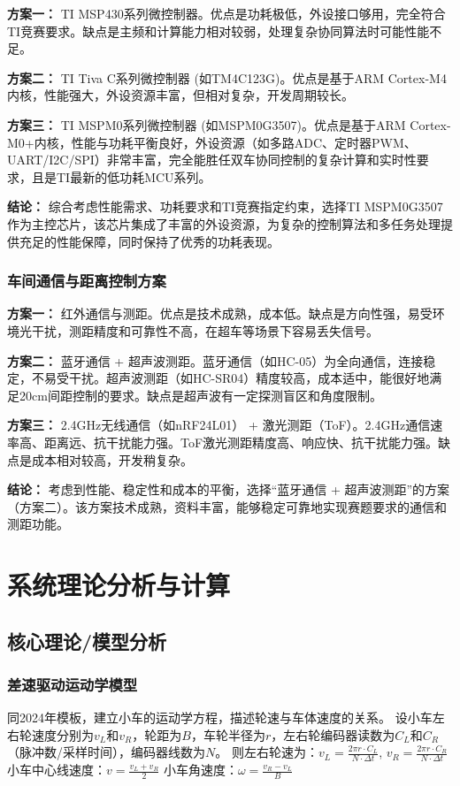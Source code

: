 \documentclass[UTF8]{ctexart}
\begin{document}
\textbf{方案一：} TI MSP430系列微控制器。优点是功耗极低，外设接口够用，完全符合TI竞赛要求。缺点是主频和计算能力相对较弱，处理复杂协同算法时可能性能不足。

\textbf{方案二：} TI Tiva C系列微控制器 (如TM4C123G)。优点是基于ARM Cortex-M4内核，性能强大，外设资源丰富，但相对复杂，开发周期较长。

\textbf{方案三：} TI MSPM0系列微控制器 (如MSPM0G3507)。优点是基于ARM Cortex-M0+内核，性能与功耗平衡良好，外设资源（如多路ADC、定时器PWM、UART/I2C/SPI）非常丰富，完全能胜任双车协同控制的复杂计算和实时性要求，且是TI最新的低功耗MCU系列。

\textbf{结论：} 综合考虑性能需求、功耗要求和TI竞赛指定约束，选择TI MSPM0G3507作为主控芯片，该芯片集成了丰富的外设资源，为复杂的控制算法和多任务处理提供充足的性能保障，同时保持了优秀的功耗表现。

\subsubsection{车间通信与距离控制方案}

\textbf{方案一：} 红外通信与测距。优点是技术成熟，成本低。缺点是方向性强，易受环境光干扰，测距精度和可靠性不高，在超车等场景下容易丢失信号。

\textbf{方案二：} 蓝牙通信 + 超声波测距。蓝牙通信（如HC-05）为全向通信，连接稳定，不易受干扰。超声波测距（如HC-SR04）精度较高，成本适中，能很好地满足20cm间距控制的要求。缺点是超声波有一定探测盲区和角度限制。

\textbf{方案三：} 2.4GHz无线通信（如nRF24L01） + 激光测距（ToF）。2.4GHz通信速率高、距离远、抗干扰能力强。ToF激光测距精度高、响应快、抗干扰能力强。缺点是成本相对较高，开发稍复杂。

\textbf{结论：} 考虑到性能、稳定性和成本的平衡，选择``蓝牙通信 + 超声波测距''的方案（方案二）。该方案技术成熟，资料丰富，能够稳定可靠地实现赛题要求的通信和测距功能。

\section{系统理论分析与计算}

\subsection{核心理论/模型分析}

\subsubsection{差速驱动运动学模型}
同2024年模板，建立小车的运动学方程，描述轮速与车体速度的关系。
设小车左右轮速度分别为$v_L$和$v_R$，轮距为$B$，车轮半径为$r$，左右轮编码器读数为$C_L$和$C_R$（脉冲数/采样时间），编码器线数为$N$。
则左右轮速为：$v_L = \frac{2\pi r \cdot C_L}{N \cdot \Delta t}$, $v_R = \frac{2\pi r \cdot C_R}{N \cdot \Delta t}$
小车中心线速度：$v = \frac{v_L + v_R}{2}$
小车角速度：$\omega = \frac{v_R - v_L}{B}$
\end{document}
